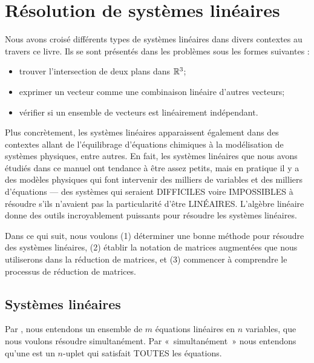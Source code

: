 \chapter{Résolution de systèmes linéaires}

\label{chapter:Fr_13-solvingsystems}

Nous avons crois\'e différents types de systèmes linéaires dans divers contextes au travers ce livre.  
Ils se sont présent\'es dans les problèmes sous les formes suivantes :   
\begin{itemize}
	\item trouver l'intersection de deux plans dans $\mathbb{R}^3$;
	\item exprimer un vecteur comme une combinaison linéaire d'autres vecteurs;
	\item vérifier si un ensemble de vecteurs est linéairement indépendant.
\end{itemize}
Plus concrètement, les systèmes linéaires apparaissent également dans des contextes allant de l'équilibrage
d'équations chimiques \`a la modélisation de systèmes physiques,  entre autres.  En fait, les systèmes linéaires que nous avons étudiés dans ce manuel ont tendance à être
assez petits, mais en pratique il y a des modèles physiques qui
font intervenir des milliers de variables et des milliers d'équations --- 
des systèmes qui seraient DIFFICILES voire IMPOSSIBLES à résoudre s'ils n'avaient pas la particularit\'e d'\^etre LINÉAIRES. L'algèbre linéaire donne
des outils incroyablement puissants pour résoudre les systèmes linéaires.

Dans ce qui suit, nous voulons (1) déterminer une bonne méthode pour
résoudre des systèmes linéaires, (2) établir la notation de matrices augmentées que nous utiliserons dans la réduction de matrices, et (3)
commencer à comprendre le processus de réduction de matrices.

\section{Systèmes linéaires}

Par , nous entendons un ensemble de $m$ équations linéaires en  
$n$ variables, que nous voulons résoudre simultanément.  Par «~simultanément~» nous entendons
qu'une  est un $n$-uplet qui satisfait TOUTES les équations.

